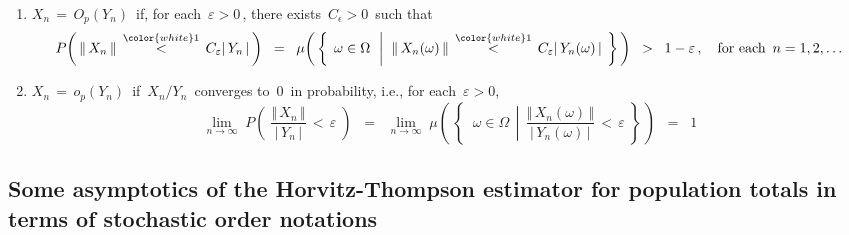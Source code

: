 \begin{definition}
\begin{enumerate}
\begin{equation*}
    \quad\quad\textnormal{equivalently,}\quad\quad
    \mu\!\left(\,\left\{\;\,
        \left.
        \omega \overset{{\color{white}1}}{\in} \Omega
        \;\;\right\vert\;
        \underset{n\rightarrow\infty}{\lim}\,\dfrac{X_{n}(\omega)}{Y_{n}(\omega)} = 0
        \;\right\}\,\right) \;=\; 1
    \end{equation*}
\item
    $X_{n} \,=\,O_{p}(Y_{n})$\, if, for each \,$\varepsilon > 0$\,,
    there exists \,$C_{\epsilon} > 0$\, such that    
    \begin{equation*}
    P\!\left(\,
        \Vert\,X_{n}\,\Vert
        \,\overset{{\color{white}1}}{<}\,
        C_{\varepsilon}\vert\,Y_{n}\,\vert
        \,\right)
    \;\; = \;\;
    \mu\!\left(\,\left\{\;\,
        \omega \in \Omega
        \,\;\left\vert\;\;
        \Vert\,X_{n}(\omega)\,\Vert
        \,\overset{{\color{white}1}}{<}\,
        C_{\varepsilon}\vert\,Y_{n}(\omega)\,\vert
        \right.
        \;\right\}\,\right)
    \;\; > \;\;
        1 - \varepsilon\,,
    \quad
    \textnormal{for each \,$n = 1, 2, \ldots$}
    \end{equation*}
\item
    $X_{n} \,=\,o_{p}(Y_{n})$\, if
    \,$X_{n}/Y_{n}$\,
    converges to \,$0$\, in probability, i.e.,
    for each \,$\varepsilon > 0$,\,
    \begin{equation*}
    \underset{n\rightarrow\infty}{\lim}\;
    P\!\left(\;
        \dfrac{\Vert\,X_{n}\,\Vert}{\vert\,Y_{n}\,\vert}
        \,<\,
        \varepsilon
        \;\right)
    \;\; = \;\;
    \underset{n\rightarrow\infty}{\lim}\;
    \mu\!\left(\,\left\{\;\;
        \omega \in \Omega
        \,\;\left\vert\,\;
        \dfrac{\Vert\,X_{n}(\omega)\,\Vert}{\vert\,Y_{n}(\omega)\,\vert}
        \,<\,
        \varepsilon
        \right.
        \;\right\}\,\right)
    \;\; = \;\;
        1
    \end{equation*}
\end{enumerate}
\end{definition}


\clearpage
\subsection{Some asymptotics of the Horvitz-Thompson estimator for population totals in terms of stochastic order notations}


